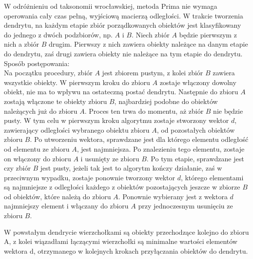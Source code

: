\documentclass[12pt,a4paper]{report}
\begin{document}
W odróżnieniu od taksonomii wrocławskiej, metoda Prima nie wymaga operowania cały czas pełną, wyjściową macierzą odległości. W trakcie tworzenia dendrytu, na każdym etapie zbiór porządkowanych obiektów jest klasyfikowany do jednego z dwóch podzbiorów, np. $A$ i $B$. Niech zbiór $A$ będzie pierwszym z nich a zbiór $B$ drugim. Pierwszy z nich zawiera obiekty należące na danym etapie do dendrytu, zaś drugi zawiera obiekty nie należące na tym etapie do dendrytu.\\
Sposób postępowania:\\
Na początku procedury, zbiór $A$ jest zbiorem pustym, z kolei zbiór $B$ zawiera wszystkie obiekty. W pierwszym kroku do zbioru $A$ zostaje włączony dowolny obiekt, nie ma to wpływu na ostateczną postać dendrytu. Następnie do zbioru $A$ zostają włączone te obiekty zbioru $B$, najbardziej podobne do obiektów należących już do zbioru $A$. Proces ten trwa do momentu, aż zbiór $B$ nie będzie pusty.  W tym celu w pierwszym kroku algorytmu zostaje stworzony wektor $d$, zawierający odległości wybranego obiektu zbioru $A$, od pozostałych obiektów zbioru $B$. Po utworzeniu wektora, sprawdzane jest dla którego elementu odległość od elementu ze zbioru $A$, jest najmniejsza. Po znalezieniu tego elementu, zostaje on włączony do zbioru $A$ i usunięty ze zbioru $B$. Po tym etapie, sprawdzane jest czy zbiór $B$ jest pusty, jeżeli tak jest to algorytm kończy działanie, zaś w przeciwnym wypadku, zostaje ponownie tworzony wektor $d$, którego elementami są najmniejsze z odległości każdego z obiektów pozostających jeszcze w zbiorze $B$ od obiektów, które należą do zbioru $A$. Ponownie wybierany jest z wektora $d$ najmniejszy element i włączany do zbioru $A$ przy jednoczesnym usunięciu ze zbioru $B$. 

W powstałym dendrycie wierzchołkami są obiekty przechodzące kolejno do zbioru A, z kolei wiązadłami łączącymi wierzchołki są minimalne wartości elementów wektora d, otrzymanego w kolejnych krokach przyłączania obiektów do dendrytu. 
\end{document}
